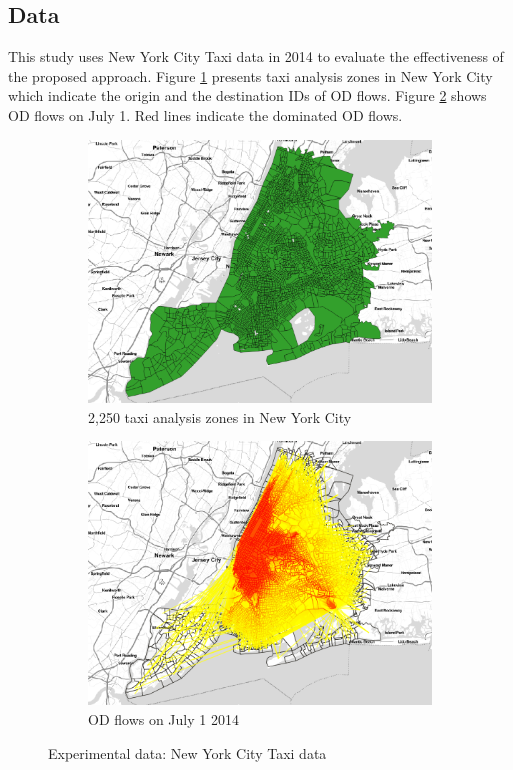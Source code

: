 \documentclass[a4paper,UKenglish]{lipics-v2016}
\begin{document}
\subsection{Data}
This study uses New York City Taxi data in 2014 to evaluate the effectiveness of the proposed approach.
Figure \ref{fig:taxizone} presents taxi analysis zones in New York City which indicate the origin and the destination IDs of OD flows. Figure \ref{fig:ODflows} shows OD flows on July 1. Red lines indicate the dominated OD flows.

\begin{figure}
	\centering
	\begin{subfigure}[b]{0.49\textwidth}
		\includegraphics[width=\textwidth]{images/taxizone.eps}
		\caption{2,250 taxi analysis zones in New York City}
		\label{fig:taxizone}
	\end{subfigure}
	\hfill %
	\begin{subfigure}[b]{0.49\textwidth}
		\includegraphics[width=\textwidth]{images/July1st_pic2.png}
		\caption{OD flows on July 1 2014}
		\label{fig:ODflows}
	\end{subfigure}
	\caption{Experimental data: New York City Taxi data}\label{fig:taxi_data}	
\end{figure}
\end{document}
